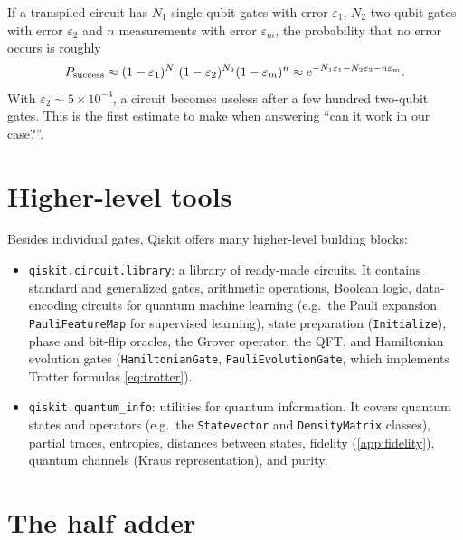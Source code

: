 \begin{keypoint}
If a transpiled circuit has $N_1$ single-qubit gates with error $\varepsilon_1$, $N_2$ two-qubit gates with error $\varepsilon_2$ and $n$ measurements with error $\varepsilon_m$, the probability
that no error occurs is roughly
\begin{equation}
  P_{\rm success}\approx(1-\varepsilon_1)^{N_1}(1-\varepsilon_2)^{N_2}(1-\varepsilon_m)^{n}\approx\mathrm e^{-N_1\varepsilon_1-N_2\varepsilon_2-n\varepsilon_m}.
\end{equation}
With $\varepsilon_2\sim5\times10^{-3}$, a circuit becomes useless after a few hundred two-qubit gates. This is the first estimate to make when answering ``can it work in our case?''.
\end{keypoint}

\section{Higher-level tools}
Besides individual gates, Qiskit offers many higher-level building blocks:
\begin{itemize}
  \item \texttt{qiskit.circuit.library}: a library of ready-made circuits. It contains standard and generalized gates, arithmetic operations, Boolean logic, data-encoding circuits for quantum
  machine learning (e.g.\ the Pauli expansion \texttt{PauliFeatureMap} for supervised learning), state preparation (\texttt{Initialize}), phase and bit-flip oracles, the Grover operator,
  the QFT, and Hamiltonian evolution gates (\texttt{HamiltonianGate}, \texttt{PauliEvolutionGate}, which implements Trotter formulas \cref{eq:trotter}).
  \item \texttt{qiskit.quantum\_info}: utilities for quantum information. It covers quantum states and operators (e.g.\ the \texttt{Statevector} and \texttt{DensityMatrix} classes), partial traces,
  entropies, distances between states, fidelity (\cref{app:fidelity}), quantum channels (Kraus representation), and purity.
\end{itemize}

\section{The half adder}\label{sec:halfadder}
